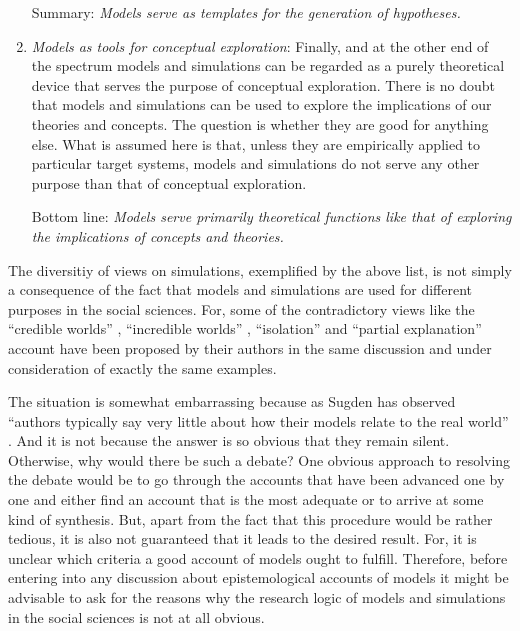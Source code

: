 \documentclass[onecollarge]{STJour}
\numberwithin{equation}{section}
\begin{document}
\begin{enumerate}
  Summary: {\em Models serve as templates for the generation of
  hypotheses.}

  \item {\em Models as tools for conceptual exploration}: Finally, and at
  the other end of the spectrum models and simulations can be regarded as
  a purely theoretical device that serves the purpose of conceptual
  exploration. There is no doubt that models and simulations can be used
  to explore the implications of our theories and concepts. The question
  is whether they are good for anything else. What is assumed here is
  that, unless they are empirically applied to particular target
  systems, models and simulations do not serve any other purpose than that of
  conceptual exploration.
  
  Bottom line: {\em Models serve primarily theoretical functions like
  that of exploring the implications of concepts and theories.}

\end{enumerate}

The diversitiy of views on simulations, exemplified by the above list,
is not simply a consequence of the fact that models and simulations are
used for different purposes in the social sciences. For, some of the
contradictory views like the ``credible worlds'' \citep[]{sugden:2009},
``incredible worlds'' \citep[]{kourikoski-lethinen:2009}, ``isolation''
\citep[]{cartwright:2009, maeki:2009} and ``partial explanation'' account
\citep[]{aydinonat:2007} have been proposed by their authors in the same
discussion and under consideration of exactly the same examples. 

The situation is somewhat embarrassing because as Sugden has observed
``authors typically say very little about how their models relate to the
real world'' \citep[p.\ 25]{sugden:2009}. And it is not because the
answer is so obvious that they remain silent. Otherwise, why would there be such
a debate? One obvious approach to resolving the debate would be to go
through the accounts that have been advanced one by one and either find
an account that is the most adequate or to arrive at some kind of
synthesis. But, apart from the fact that this procedure would be rather
tedious, it is also not guaranteed that it leads to the desired result.
For, it is unclear which criteria a good account of models ought
to fulfill. Therefore, before entering into any discussion about
epistemological accounts of models it might be advisable to ask for the
reasons why the research logic of models and simulations in the social
sciences is not at all obvious.
\end{document}
